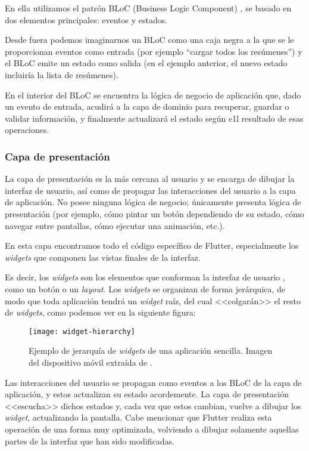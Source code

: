 En ella utilizamos el patrón BLoC (Business Logic Component) \cite{miola20}, se basado en dos elementos principales: eventos y estados.

Desde fuera podemos imaginarnos un BLoC como una caja negra a la que se le proporcionan eventos como entrada (por ejemplo ``cargar todos los resúmenes'') y el BLoC emite un estado como salida (en el ejemplo anterior, el nuevo estado incluiría la lista de resúmenes).

En el interior del BLoC se encuentra la lógica de negocio de aplicación que, dado un evento de entrada, acudirá a la capa de dominio para recuperar, guardar o validar información, y finalmente actualizará el estado según e1l resultado de esas operaciones.

\subsubsection{Capa de presentación}

La capa de presentación es la más cercana al usuario y se encarga de dibujar la interfaz de usuario, así como de propagar las interacciones del usuario a la capa de aplicación. No posee ninguna lógica de negocio; únicamente presenta lógica de presentación (por ejemplo, cómo pintar un botón dependiendo de su estado, cómo navegar entre pantallas, cómo ejecutar una animación, etc.).

En esta capa encontramos todo el código específico de Flutter, especialmente los \emph{widgets} que componen las vistas finales de la interfaz.

Es decir, los \emph{widgets} son los elementos que conforman la interfaz de usuario \cite{flutter-widget}, como un botón o un \emph{layout}. Los \emph{widgets} se organizan de forma jerárquica, de modo que toda aplicación tendrá un \emph{widget} raíz, del cual <<colgarán>> el resto de \emph{widgets}, como podemos ver en la siguiente figura:

\begin{figure}[h!]
	\centering
	\texttt{[image: widget-hierarchy]}
	\caption[Ejemplo de jerarquía de \emph{widgets}.]{Ejemplo de jerarquía de \emph{widgets} de una aplicación sencilla. Imagen del dispositivo móvil extraída de \cite{miola20}.}
	\label{flutter-widgets}
\end{figure}

Las interacciones del usuario se propagan como eventos a los BLoC de la capa de aplicación, y estos actualizan su estado acordemente. La capa de presentación <<escucha>> dichos estados y, cada vez que estos cambian, vuelve a dibujar los \emph{widget}, actualizando la pantalla. Cabe mencionar que Flutter realiza esta operación de una forma muy optimizada, volviendo a dibujar solamente aquellas partes de la interfaz que han sido modificadas.


